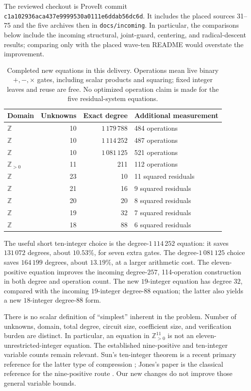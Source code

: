 \documentclass[11pt]{article}
\theoremstyle{definition}
\theoremstyle{remark}
\newcommand{\Z}{\mathbb Z}
\newcommand{\Pos}{\mathbb Z_{>0}}
\newcommand{\file}[1]{\nolinkurl{#1}}
\begin{document}
The reviewed checkout is ProveIt commit
\file{c1a102936aca437e9999530a0111e6ddab56dc6d}. It includes the placed
sources 31--75 and the five archives then in \file{docs/incoming}.
In particular, the comparisons below include the incoming structural,
joint-guard, centering, and radical-descent results; comparing only with
the placed wave-ten README would overstate the improvement.

\begin{table}[ht]
\centering
\small
\begin{tabular}{@{}lrrl@{}}
\toprule
Domain & Unknowns & Exact degree & Additional measurement\\
\midrule
$\Z$ & 10 & $1\,179\,788$ & 484 operations\\
$\Z$ & 10 & $1\,114\,252$ & 487 operations\\
$\Z$ & 10 & $1\,081\,125$ & 521 operations\\
$\Pos$ & 11 & 211 & 112 operations\\
$\Z$ & 23 & 10 & 11 squared residuals\\
$\Z$ & 21 & 16 & 9 squared residuals\\
$\Z$ & 20 & 20 & 8 squared residuals\\
$\Z$ & 19 & 32 & 7 squared residuals\\
$\Z$ & 18 & 88 & 6 squared residuals\\
\bottomrule
\end{tabular}
\caption{Completed new equations in this delivery. Operations mean live
binary $+,-,\times$ gates, including scalar products and squaring; fixed
integer leaves and reuse are free. No optimized operation claim is made
for the five residual-system equations.}
\label{tab:results}
\end{table}

The useful short ten-integer choice is the degree-$1\,114\,252$ equation:
it saves $131\,072$ degrees, about $10.53\%$, for seven extra gates.
The degree-$1\,081\,125$ choice saves $164\,199$ degrees, about $13.19\%$,
at a larger arithmetic cost. The eleven-positive equation improves the
incoming degree-$257$, 114-operation construction in both degree
and operation count. The new $19$-integer equation has degree $32$, compared with the
incoming $19$-integer degree-$88$ equation; the latter also yields a new
$18$-integer degree-$88$ form.

There is no scalar definition of ``simplest'' inherent in the problem.
Number of unknowns, domain, total degree, circuit size, coefficient size,
and verification burden are distinct. In particular, an equation in
$\Pos^{11}$ is not an eleven-unrestricted-integer equation. The established
nine-positive and ten-integer variable counts remain relevant. Sun's
ten-integer theorem is a recent primary reference for the latter type of
compression \cite{sun2026}; Jones's paper is the classical reference for
the nine-positive route \cite{jones1982}. Our new changes do not improve
those general variable bounds.
\end{document}
